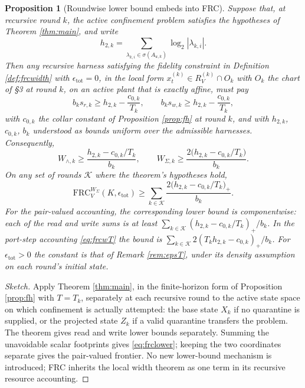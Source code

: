 \documentclass[11pt]{article}
\newtheorem{proposition}{Proposition}[section]
\theoremstyle{definition}
\theoremstyle{remark}
\newcommand{\W}{W}
\begin{document}
\begin{proposition}[Roundwise lower bound embeds into FRC]\label{prop:lower}
Suppose that, at recursive round $k$, the active confinement problem satisfies the hypotheses of Theorem \ref{thm:main}, and write
\begin{equation}
h_{2,k}=\sum_{\lambda_{k,i}\in\sigma(A_{u,k})}\log_2|\lambda_{k,i}|.
\end{equation}
Then any recursive harness satisfying the fidelity constraint in Definition \ref{def:frcwidth} with $\epsilon_{\mathrm{tot}}=0$, in the local form $x^{(k)}_t\in R^{(k)}_V\cap O_k$ with $O_k$ the chart of \S3 at round $k$, on an active plant that is exactly affine, must pay
\begin{equation}
b_ks_{r,k}\ge h_{2,k}-\frac{c_{0,k}}{T_k},\qquad b_ks_{w,k}\ge h_{2,k}-\frac{c_{0,k}}{T_k},
\end{equation}
with $c_{0,k}$ the collar constant of Proposition \ref{prop:fh} at round $k$, and with $h_{2,k}$, $c_{0,k}$, $b_k$ understood as bounds uniform over the admissible harnesses. Consequently,
\begin{equation}
\W_{\wedge,k}\ge\frac{h_{2,k}-c_{0,k}/T_k}{b_k},\qquad \W_{\Sigma,k}\ge\frac{2\big(h_{2,k}-c_{0,k}/T_k\big)}{b_k}.
\end{equation}
On any set of rounds $\mathcal K$ where the theorem's hypotheses hold,
\begin{equation}
\mathrm{FRC}^{\W_\Sigma}_V(K,\epsilon_{\mathrm{tot}})\ge\sum_{k\in\mathcal K}\frac{2\big(h_{2,k}-c_{0,k}/T_k\big)_+}{b_k}. \label{eq:frclower}
\end{equation}
For the pair-valued accounting, the corresponding lower bound is componentwise: each of the read and write sums is at least $\sum_{k\in\mathcal K}(h_{2,k}-c_{0,k}/T_k)_+/b_k$. In the port-step accounting \eqref{eq:frcwT} the bound is $\sum_{k\in\mathcal K}2(T_kh_{2,k}-c_{0,k})_+/b_k$. For $\epsilon_{\mathrm{tot}}>0$ the constant is that of Remark \ref{rem:epsT}, under its density assumption on each round's initial state.
\end{proposition}
\begin{proof}[Sketch]
Apply Theorem \ref{thm:main}, in the finite-horizon form of Proposition \ref{prop:fh} with $T=T_k$, separately at each recursive round to the active state space on which confinement is actually attempted: the base state $X_k$ if no quarantine is supplied, or the projected state $Z_k$ if a valid quarantine transfers the problem. The theorem gives read and write lower bounds separately. Summing the unavoidable scalar footprints gives \eqref{eq:frclower}; keeping the two coordinates separate gives the pair-valued frontier. No new lower-bound mechanism is introduced; FRC inherits the local width theorem as one term in its recursive resource accounting.
\end{proof}
\end{document}
